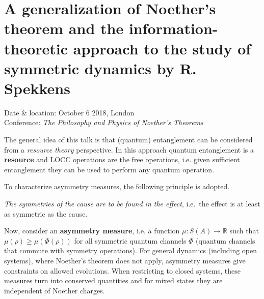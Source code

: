 \section{A generalization of Noether's theorem and the information-theoretic approach to the study of symmetric dynamics by R. Spekkens}

    Date \& location: October 6 2018, London\\
    Conference: \textit{The Philosophy and Physics of Noether's Theorems}

    The general idea of this talk is that (quantum) entanglement can be considered from a \textit{resource theory} perspective. In this approach quantum entanglement is a \textbf{resource} and LOCC operations are the free operations, i.e. given sufficient entanglement they can be used to perform any quantum operation.

    To characterize asymmetry measures, the following principle is adopted.
    \begin{axiom}
        \textit{The symmetries of the cause are to be found in the effect}, i.e.~the effect is at least as symmetric as the cause.
    \end{axiom}

    Now, consider an \textbf{asymmetry measure}, i.e. a function $\mu:S(A)\rightarrow\mathbb{R}$ such that $\mu(\rho)\geq\mu(\Phi(\rho))$ for all symmetric quantum channels $\Phi$ (quantum channels that commute with symmetry operations). For general dynamics (including open systems), where Noether's theorem does not apply, asymmetry measures give constraints on allowed evolutions. When restricting to closed systems, these measures turn into conserved quantities and for mixed states they are independent of Noether charges.